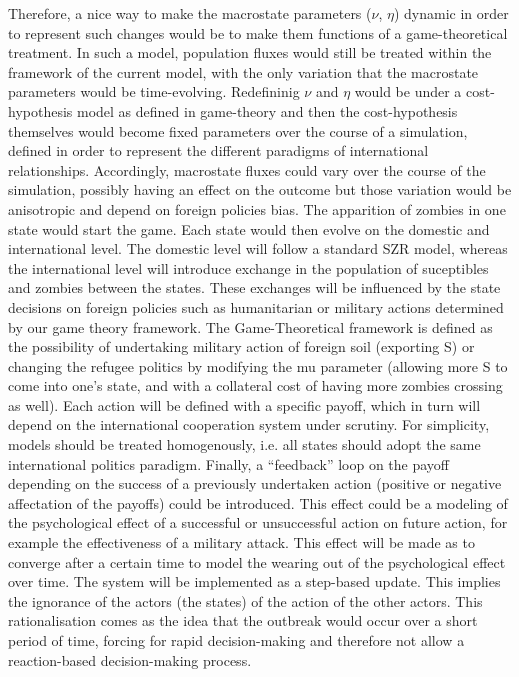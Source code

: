 \documentclass[11pt]{article} %
\begin{document}
Therefore, a nice way to make the macrostate parameters ($\nu$, $\eta$) dynamic in order to represent such changes would be to make them functions of a game-theoretical treatment. In such a model, population fluxes would still be treated within the framework of the current model, with the only variation that the macrostate parameters would be time-evolving. Redefininig $\nu$ and $\eta$ would be under a cost-hypothesis model as defined in game-theory and then the cost-hypothesis themselves would become fixed parameters over the course of a simulation, defined in order to represent the different paradigms of international relationships. Accordingly, macrostate fluxes could vary over the course of the simulation, possibly having an effect on the outcome but those variation would be anisotropic and depend on foreign policies bias. The apparition of zombies in one state would start the game. Each state would then evolve on the domestic and international level. The domestic level will follow a standard SZR model, whereas the international level will introduce exchange in the population of suceptibles and zombies between the states. These exchanges will be influenced by the state decisions on foreign policies such as humanitarian or military actions determined by our game theory framework. The Game-Theoretical framework is defined as the possibility of undertaking military action of foreign soil (exporting S) or changing the refugee politics by modifying the mu parameter (allowing more S to come into one's state, and with a collateral cost of having more zombies crossing as well). Each action will be defined with a specific payoff, which in turn will depend on the international cooperation system under scrutiny. For simplicity, models should be treated homogenously, i.e. all states should adopt the same international politics paradigm. Finally, a ``feedback'' loop on the payoff depending on the success of a previously undertaken action (positive or negative affectation of the payoffs) could be introduced. This effect could be a modeling of the psychological effect of a successful or unsuccessful action on future action, for example the effectiveness of a military attack. This effect will be made as to converge after a certain time to model the wearing out of the psychological effect over time. The system will be implemented as a step-based update. This implies the ignorance of the actors (the states) of the action of the other actors. This rationalisation comes as the idea that the outbreak would occur over a short period of time, forcing for rapid decision-making and therefore not allow a reaction-based decision-making process. 
\end{document}
